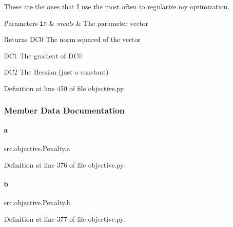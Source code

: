 These are the ones that I use the most often to regularize my optimization.


\begin{DoxyParams}[1]{Parameters}
\mbox{\tt in}  & {\em mvals} & The parameter vector \\
\hline
\end{DoxyParams}
\begin{DoxyReturn}{Returns}
D\+C0 The norm squared of the vector 

D\+C1 The gradient of D\+C0 

D\+C2 The Hessian (just a constant) 
\end{DoxyReturn}


Definition at line 450 of file objective.\+py.



\subsubsection{Member Data Documentation}
\mbox{\label{classsrc_1_1objective_1_1Penalty_ae4a8c21e4d3f5c7e5d1861dec88a35cd}} 
\paragraph{\texorpdfstring{a}{a}}
{\footnotesize\ttfamily src.\+objective.\+Penalty.\+a}



Definition at line 376 of file objective.\+py.

\mbox{\label{classsrc_1_1objective_1_1Penalty_a24f907fe33df0c1da1cbf50795d64ec9}} 
\paragraph{\texorpdfstring{b}{b}}
{\footnotesize\ttfamily src.\+objective.\+Penalty.\+b}



Definition at line 377 of file objective.\+py.

\mbox{\label{classsrc_1_1objective_1_1Penalty_ac3c1f33c407b580bbb1d5c91a82c8801}} 
